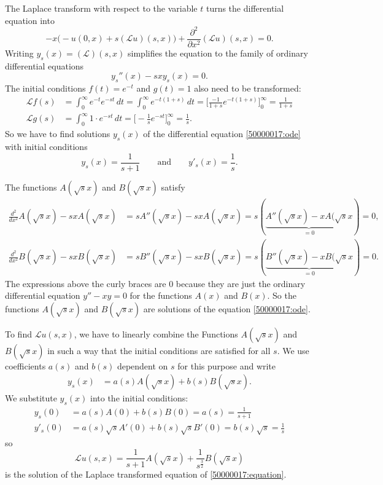 \begin{loesung}
\begin{teilaufgaben}
\item
The Laplace transform with respect to the variable $t$ turns the differential
equation into
\[
-
x\biggl(
-u(0,x) + s(\mathcal{L}u)(s,x)
\biggr)
+\frac{\partial^2}{\partial x^2} (\mathcal{L}u)(s,x)
=
0.
\]
Writing $y_s(x) = (\mathcal{L})(s,x)$ simplifies the equation to
the family of ordinary differential equations
\begin{equation}
y_s''(x)  -sxy_s(x) = 0.
\label{50000017:ode}
\end{equation}
The initial conditions $f(t)=e^{-t}$ and $g(t)=1$ also need to be transformed:
\begin{align*}
\mathcal{L}f(s)
&=
\int_0^\infty e^{-t} e^{-st}\,dt
=
\int_0^\infty e^{-t(1+s)} \,dt
=
\biggl[
\frac{-1}{1+s}e^{-t(1+s)}
\biggr]_0^\infty
=
\frac1{1+s}
\\
\mathcal{L}g(s)
&=
\int_0^\infty 1\cdot e^{-st}\,dt
=
\biggl[ -\frac1se^{-st}\biggr]_0^\infty
=
\frac1s.
\end{align*}
So we have to find solutions $y_s(x)$ of the differential equation
\eqref{50000017:ode} with initial conditions
\[
y_s(x) = \frac1{s+1}
\qquad
\text{and}
\qquad
y'_s(x) = \frac{1}{s}.
\]
\item
The functions $A(\sqrt{s}x)$ and $B(\sqrt{s}x)$ satisfy
\begin{align*}
\frac{d^2}{dx^2}A(\sqrt{s}x)
-
sxA(\sqrt{s}x)
&=
sA''(\sqrt{s}x)-sxA(\sqrt{s}x)
=
s(\underbrace{A''(\sqrt{s}x)-xA(\sqrt{s}x}_{\displaystyle=0})
=
0,
\\
\frac{d^2}{dx^2}B(\sqrt{s}x)
-
sxB(\sqrt{s}x)
&=
sB''(\sqrt{s}x)-sxB(\sqrt{s}x)
=
s(\underbrace{B''(\sqrt{s}x)-xB(\sqrt{s}x}_{\displaystyle=0})
=
0.
\end{align*}
The expressions above the curly braces are $0$ because they are just
the ordinary 
differential equation $y''-xy=0$ for the functions $A(x)$ and $B(x)$.
So the functions $A(\sqrt{s}x)$ and $B(\sqrt{s}x)$ are solutions of
the equation \eqref{50000017:ode}.
\item
To find $\mathcal{L}u(s,x)$, we have to linearly combine the
Functions $A(\sqrt{s}x)$ and $B(\sqrt{s}x)$ in such a way that the
initial conditions are satisfied for all $s$.
We use coefficients $a(s)$ and $b(s)$  dependent on $s$ for this purpose
and write 
\begin{align*}
y_s(x)
&=
a(s)
A(\sqrt{s}x) +
b(s)
B(\sqrt{s}x).
\end{align*}
We substitute $y_s(x)$ into the initial conditions:
\begin{align*}
y_s(0) &= a(s) A(0) + b(s) B(0) = a(s) = \frac{1}{s+1}
\\
y'_s(0)&= a(s)\sqrt{s}A'(0) + b(s) \sqrt{s}B'(0) = b(s)\sqrt{s} = \frac{1}{s}
\end{align*}
so
\[
\mathcal{L}u(s,x)
=
\frac1{s+1} A(\sqrt{s}x)
+
\frac{1}{s^{\frac32}} B(\sqrt{s}x)
\]
is the solution of the Laplace transformed equation of
\eqref{50000017:equation}.
\qedhere
\end{teilaufgaben}
\end{loesung}

